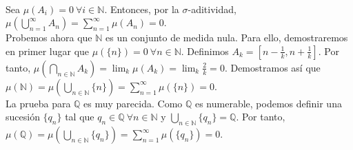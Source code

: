 \\

  Sea $\mu(A_i)=0 \ \forall i \in \mathbb{N}$. Entonces, por la $\sigma$-aditividad, \
  $\mu(\bigcup_{n=1}^{\infty} A_n) = \sum_{n=1}^{\infty} \mu(A_n) = 0$.\\

  Probemos ahora que $\mathbb{N}$ es un conjunto de medida nula.
  Para ello, demostraremos en primer lugar que
  $\mu(\lbrace n \rbrace) = 0 \ \forall n \in \mathbb{N}$.
  Definimos $A_k = [n - \frac{1}{k}, n + \frac{1}{k}]$.
  Por tanto, $\mu(\bigcap_{n \in \mathbb{N}} A_k) = \lim_k\mu(A_k) = \lim_k\frac{2}{k} = 0$.
  Demostramos as\'i que
  $\mu(\mathbb{N}) = \mu(\bigcup_{n \in \mathbb{N}} \lbrace n \rbrace)
  = \sum_{n=1}^{\infty} \mu(\lbrace n \rbrace) = 0$.\\

  La prueba para $\mathbb{Q}$ es muy parecida.
  Como $\mathbb{Q}$ es numerable, podemos definir una sucesi\'on $\lbrace q_n \rbrace$ tal que
  $q_n \in \mathbb{Q} \ \forall n \in \mathbb{N}$ y
  $\bigcup_{n \in \mathbb{N}} \lbrace q_n \rbrace = \mathbb{Q}$. Por tanto,
  $\mu(\mathbb{Q}) = \mu(\bigcup_{n \in \mathbb{N}} \lbrace q_n \rbrace)
  = \sum_{n=1}^{\infty} \mu(\lbrace q_n \rbrace) = 0$.

